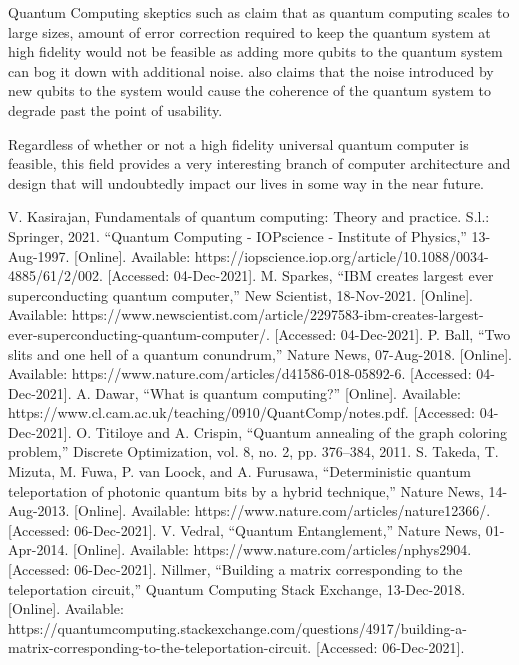 \documentclass[conference]{IEEEtran}
\begin{document}
Quantum Computing skeptics such as \cite{b16} claim that as quantum computing scales to large sizes, amount of error correction required to keep the quantum system at high fidelity would not be feasible as adding more qubits to the quantum system can bog it down with additional noise. \cite{b16} also claims that the noise introduced by new qubits to the system would cause the coherence of the quantum system to degrade past the point of usability.

Regardless of whether or not a high fidelity universal quantum computer is feasible, this field provides a very interesting branch of computer architecture and design that will undoubtedly impact our lives in some way in the near future.

\begin{thebibliography}{00}
 V. Kasirajan, Fundamentals of quantum computing: Theory and practice. S.l.: Springer, 2021.
 “Quantum Computing - IOPscience - Institute of Physics,” 13-Aug-1997. [Online]. Available: https://iopscience.iop.org/article/10.1088/0034-4885/61/2/002. [Accessed: 04-Dec-2021]. 
 M. Sparkes, “IBM creates largest ever superconducting quantum computer,” New Scientist, 18-Nov-2021. [Online]. Available: https://www.newscientist.com/article/2297583-ibm-creates-largest-ever-superconducting-quantum-computer/. [Accessed: 04-Dec-2021]. 
 P. Ball, “Two slits and one hell of a quantum conundrum,” Nature News, 07-Aug-2018. [Online]. Available: https://www.nature.com/articles/d41586-018-05892-6. [Accessed: 04-Dec-2021].
 A. Dawar, “What is quantum computing?” [Online]. Available: https://www.cl.cam.ac.uk/teaching/0910/QuantComp/notes.pdf. [Accessed: 04-Dec-2021].
 O. Titiloye and A. Crispin, “Quantum annealing of the graph coloring problem,” Discrete Optimization, vol. 8, no. 2, pp. 376–384, 2011. 
 S. Takeda, T. Mizuta, M. Fuwa, P. van Loock, and A. Furusawa, “Deterministic quantum teleportation of photonic quantum bits by a hybrid technique,” Nature News, 14-Aug-2013. [Online]. Available: https://www.nature.com/articles/nature12366/. [Accessed: 06-Dec-2021]. 
 V. Vedral, “Quantum Entanglement,” Nature News, 01-Apr-2014. [Online]. Available: https://www.nature.com/articles/nphys2904. [Accessed: 06-Dec-2021]. 
 Nillmer, “Building a matrix corresponding to the teleportation circuit,” Quantum Computing Stack Exchange, 13-Dec-2018. [Online]. Available: https://quantumcomputing.stackexchange.com/questions/4917/building-a-matrix-corresponding-to-the-teleportation-circuit. [Accessed: 06-Dec-2021].

\end{thebibliography}
\end{document}
